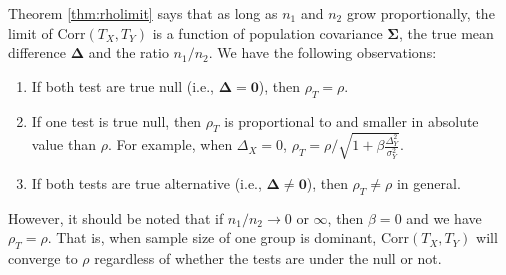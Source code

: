 \documentclass[12pt, a4paper]{article}
\newtheorem{corollary}{corollary}
\newcommand{\cor}{\text{Corr}}
\begin{document}
	Theorem \ref{thm:rholimit} says that as long as $n_1$ and $n_2$ grow proportionally, the limit of $\cor(T_X, T_Y)$ is a function of population covariance $\bm \Sigma$, the true mean difference $\bm \Delta$ and the ratio $n_1/n_2$. We have the following observations:
	\begin{enumerate}
		\item If both test are true null (i.e., $\bm \Delta = \bm 0$), then $\rho_T = \rho$.
		\item If one test is true null, then $\rho_T$ is proportional to and smaller in absolute value than $\rho$. For example, when $\Delta_X=0$, $\rho_T = \rho /\sqrt{1 + \beta \frac{\Delta_Y^2}{\sigma_Y^2}}$. 
		\item If both tests are true alternative (i.e., $\bm \Delta \neq \bm 0$), then $\rho_T\neq \rho$ in general.
	\end{enumerate}
	
	However, it should be noted that if $n_1/n_2 \rightarrow 0$ or $\infty$, then $\beta = 0$ and we have $\rho_T = \rho$. That is, when sample size of one group is dominant, $\cor(T_X, T_Y)$ will converge to $\rho$ regardless of whether the tests are under the null or not. 
	
\end{document}

